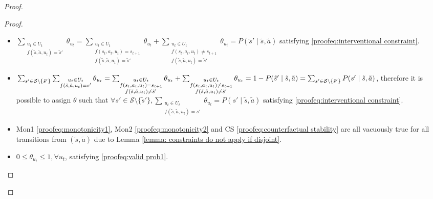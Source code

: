 \begin{proof}
\begin{proof}
\begin{itemize}
        \item $\sum_{\substack{u_t \in U_t \\f(\tilde{s}, \tilde{a}, u_t) = \tilde{s}'}} \theta_{u_t} = \sum_{\substack{u_t \in U_t \\f(s_t, a_t, u_t) = s_{t+1} \\ f(\tilde{s}, \tilde{a}, u_t) = \tilde{s}'}} \theta_{u_t} + \sum_{\substack{u_t \in U_t \\f(s_t, a_t, u_t) \neq s_{t+1} \\ f(\tilde{s}, \tilde{a}, u_t) = \tilde{s}'}} \theta_{u_t} = P(\tilde{s}' \mid \tilde{s}, \tilde{a})$ satisfying \eqref{proofeq:interventional constraint}.
        
        \item $\sum_{s' \in \mathcal{S}\setminus\{\tilde{s}'\}}\sum_{\substack{u_t \in U_t \\f(\tilde{s}, \tilde{a}, u_t) = s'}} \theta_{u_t} = \sum_{\substack{u_t \in U_t \\f(s_t, a_t, u_t) = s_{t+1} \\ f(\tilde{s}, \tilde{a}, u_t) \neq \tilde{s}'}} \theta_{u_t} + \sum_{\substack{u_t \in U_t \\f(s_t, a_t, u_t) \neq s_{t+1} \\ f(\tilde{s}, \tilde{a}, u_t) \neq \tilde{s}'}} \theta_{u_t} \\ = 1 - P(\tilde{s}' \mid \tilde{s}, \tilde{a}) = \sum_{s' \in \mathcal{S}\setminus\{\tilde{s}'\}}P(s' \mid \tilde{s}, \tilde{a})$, therefore it is possible to assign $\theta$ such that $\forall s' \in \mathcal{S}\setminus\{\tilde{s}'\}, \sum_{\substack{u_t \in U_t \\ f(\tilde{s}, \tilde{a}, u_t) = s'}}{\theta_{u_t}} = P(s' \mid \tilde{s}, \tilde{a})$ satisfying \eqref{proofeq:interventional constraint}.
        
        \item Mon1 \eqref{proofeq:monotonicity1}, Mon2 \eqref{proofeq:monotonicity2} and CS \eqref{proofeq:counterfactual stability} are all vacuously true for all transitions from $(\tilde{s}, \tilde{a})$ due to Lemma \ref{lemma: constraints do not apply if disjoint}.

        \item $0 \leq \theta_{u_t} \leq 1, \forall u_t$, satisfying \eqref{proofeq:valid prob1}.
        

\end{itemize}
\end{proof}
\end{proof}
